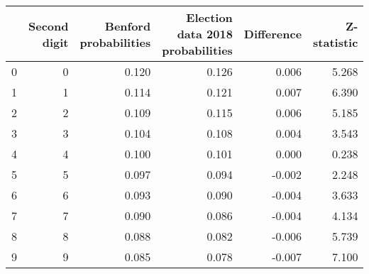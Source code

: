 \begin{tabular}{lrrrrr}
\toprule
 & Second digit & Benford probabilities & Election data 2018 probabilities & Difference & Z-statistic \\
\midrule
0 & 0 & 0.120 & 0.126 & 0.006 & 5.268 \\
1 & 1 & 0.114 & 0.121 & 0.007 & 6.390 \\
2 & 2 & 0.109 & 0.115 & 0.006 & 5.185 \\
3 & 3 & 0.104 & 0.108 & 0.004 & 3.543 \\
4 & 4 & 0.100 & 0.101 & 0.000 & 0.238 \\
5 & 5 & 0.097 & 0.094 & -0.002 & 2.248 \\
6 & 6 & 0.093 & 0.090 & -0.004 & 3.633 \\
7 & 7 & 0.090 & 0.086 & -0.004 & 4.134 \\
8 & 8 & 0.088 & 0.082 & -0.006 & 5.739 \\
9 & 9 & 0.085 & 0.078 & -0.007 & 7.100 \\
\bottomrule
\end{tabular}
